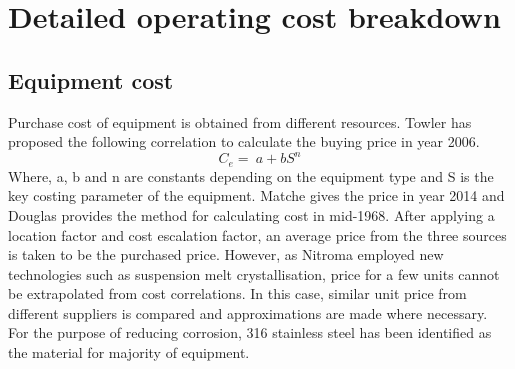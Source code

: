 \section{Detailed operating cost breakdown}
\subsection{Equipment cost}
Purchase cost of equipment is obtained from different resources. Towler \cite{sinnott_chemical_2020} has proposed the following correlation to calculate the buying price in year 2006.
\begin{equation}
    C_{e}=\ a+bS^n
\end{equation}
Where, a, b and n are constants depending on the equipment type and S is the key costing parameter of the equipment. Matche \cite{noauthor_matches_nodate} gives the price in year 2014 and Douglas \cite{douglas_conceptual_1988} provides the method for calculating cost in mid-1968. After applying a location factor and cost escalation factor, an average price from the three sources is taken to be the purchased price. However, as Nitroma employed new technologies such as suspension melt crystallisation, price for a few units cannot be extrapolated from cost correlations. In this case, similar unit price from different suppliers is compared and approximations are made where necessary. For the purpose of reducing corrosion, 316 stainless steel has been identified as the material for majority of equipment.

